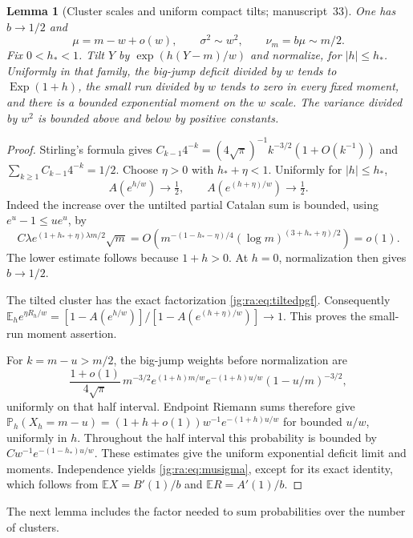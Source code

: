 \documentclass[11pt,a4paper]{article}
\newtheorem{lemma}[lemma]{Lemma}
\theoremstyle{definition}\newaliascnt{definition}{theorem}
\theoremstyle{remark}\newaliascnt{remark}{theorem}
\newcommand{\ljP}{\mathbb P}
\newcommand{\ljE}{\mathbb E}
\begin{document}
\begin{lemma}[Cluster scales and uniform compact tilts; manuscript~33]
\label{jg:ra:lem:cluster}
One has $b\to1/2$ and
\begin{equation}\label{jg:ra:eq:musigma}
 \mu=m-w+o(w),\qquad \sigma^2\sim w^2,\qquad
 \nu_m=b\mu\sim m/2.
\end{equation}
Fix $0<h_*<1$. Tilt $Y$ by $\exp(h(Y-m)/w)$ and normalize, for $|h|\le h_*$.
Uniformly in that family, the big-jump deficit divided by $w$ tends to
$\operatorname{Exp}(1+h)$, the small run divided by $w$ tends to zero in every
fixed moment, and there is a bounded exponential moment on the $w$ scale. The
variance divided by $w^2$ is bounded above and below by positive constants.
\end{lemma}
\begin{proof}
Stirling's formula gives
$C_{k-1}4^{-k}=(4\sqrt\pi)^{-1}k^{-3/2}(1+O(k^{-1}))$ and
$\sum_{k\ge1}C_{k-1}4^{-k}=1/2$. Choose $\eta>0$ with $h_*+\eta<1$. Uniformly for
$|h|\le h_*$,
\[
 A(e^{h/w})\to\tfrac12,\qquad A(e^{(h+\eta)/w})\to\tfrac12.
\]
Indeed the increase over the untilted partial Catalan sum is bounded, using
$e^u-1\le ue^u$, by
\[
 C\lambda e^{(1+h_*+\eta)\lambda m/2}\sqrt m
 =O\!\left(m^{-(1-h_*-\eta)/4}
             (\log m)^{(3+h_*+\eta)/2}\right)=o(1).
\]
The lower estimate follows because $1+h>0$. At $h=0$, normalization then gives
$b\to1/2$.

The tilted cluster has the exact factorization \eqref{jg:ra:eq:tiltedpgf}.
Consequently $\ljE_h e^{\eta R_h/w}=[1-A(e^{h/w})]/[1-A(e^{(h+\eta)/w})]\to1$.
This proves the small-run moment assertion.

For $k=m-u>m/2$, the big-jump weights before normalization are
\[
 \frac{1+o(1)}{4\sqrt\pi}\,
 m^{-3/2}e^{(1+h)m/w}e^{-(1+h)u/w}(1-u/m)^{-3/2},
\]
uniformly on that half interval. Endpoint Riemann sums therefore give
$\ljP_h(X_h=m-u)=(1+h+o(1))w^{-1}e^{-(1+h)u/w}$ for bounded $u/w$, uniformly in
$h$. Throughout the half interval this probability is bounded by
$Cw^{-1}e^{-(1-h_*)u/w}$. These estimates give the uniform exponential deficit
limit and moments. Independence yields \eqref{jg:ra:eq:musigma}, except for its
exact identity, which follows from $\ljE X=B'(1)/b$ and $\ljE R=A'(1)/b$.
\end{proof}

The next lemma includes the factor needed to sum probabilities over the number
of clusters.
\end{document}
